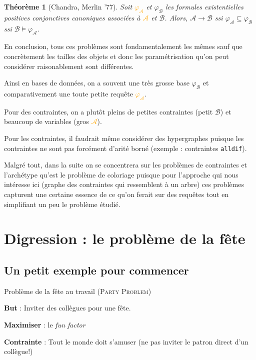 \documentclass[a4paper,12pt]{article}
\newtheorem{theorem}{Théorème}
\theoremstyle{definition}
\theoremstyle{remark}
\begin{document}
\begin{theorem}[Chandra, Merlin '77]
  Soit \textcolor{orange}{$\varphi_\mathcal{A}$} et \textcolor{OliveGreen}{$\varphi_\mathcal{B}$} les formules
  existentielles positives  conjonctives canoniques associées à
  \textcolor{orange}{$\mathcal{A}$} et \textcolor{OliveGreen}{$\mathcal{B}$}. 
  Alors, $\mathcal{A}\rightarrow\mathcal{B}$ ssi
  $\varphi_\mathcal{A}\subseteq \varphi_\mathcal{B}$ ssi
  $\mathcal{B}\models \varphi_\mathcal{A}$.
\end{theorem}

En conclusion, tous ces problèmes sont fondamentalement les mêmes sauf
que concrètement les tailles des objets et donc les paramétrisation qu'on
peut considérer raisonablement sont différentes. 

Ainsi en bases de données, on a souvent une très grosse base
\textcolor{OliveGreen}{$\varphi_\mathcal{B}$} et comparativement une
toute petite requête \textcolor{orange}{$\varphi_\mathcal{A}$}.

Pour des contraintes, on a plutôt pleins de petites contraintes (petit
\textcolor{OliveGreen}{$\mathcal{B}$}) et beaucoup de variables (gros 
\textcolor{orange}{$\mathcal{A}$}).

Pour les contraintes, il faudrait même considérer des hypergraphes
puisque les contraintes ne sont pas forcément d'arité borné (exemple :
contraintes \texttt{alldif}).

Malgré tout, dans la suite on se concentrera sur les problèmes de
contraintes et l'archétype qu'est le problème de coloriage puisque pour l'approche qui nous intéresse
ici (graphe des contraintes qui ressemblent à un arbre) ces problèmes capturent
une certaine essence de ce qu'on ferait sur des requêtes tout en simplifiant un peu le problème étudié. 

\pagebreak

\section{Digression : le problème de la fête}
\subsection*{Un petit exemple pour commencer}

\begin{framed}
  Problème de la fête au travail (\textsc{Party Problem}) 
  \begin{compactitem}
  \item 
    \textbf{But} : Inviter des collègues pour une fête.
  \item
    \textbf{Maximiser} : le \emph{fun factor}
  \item 
    \textbf{Contrainte} : Tout le monde doit s'amuser (ne pas inviter
    le patron direct d'un collègue!)
  \end{compactitem}
\end{framed}
\end{document}

